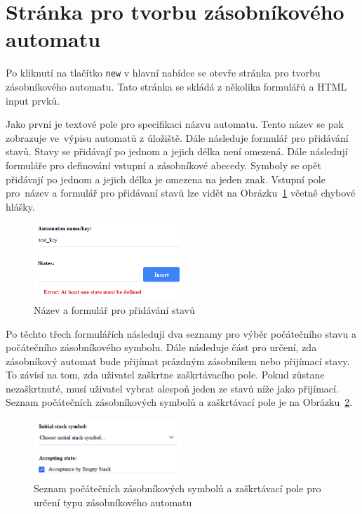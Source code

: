\section{Stránka pro tvorbu zásobníkového automatu}\label{sec:PDABuilder}

Po kliknutí na tlačítko \texttt{new} v hlavní nabídce se otevře stránka pro tvorbu zásobníkového automatu. Tato stránka se skládá z několika formulářů a HTML input prvků. 

Jako první je textové pole pro specifikaci názvu automatu. Tento název se pak zobrazuje ve~výpisu automatů z úložiště. Dále následuje formulář pro přidávání stavů. Stavy se přidávají po jednom a jejich délka není omezená. Dále následují formuláře pro definování vstupní a zásobníkové abecedy. Symboly se opět přidávají po jednom a jejich délka je omezena na jeden znak. Vstupní pole pro~název a formulář pro přidávaní stavů lze vidět na Obrázku~\ref{fig:BuilderPart1} včetně chybové hlášky.

\begin{figure}[h]
    \centering
    \includegraphics[width=0.5\textwidth]{Figures/PrntScrn_UI_BuilderPart1.png}
    \caption{Název a formulář pro přidávání stavů}\label{fig:BuilderPart1}
\end{figure}

Po těchto třech formulářích následují dva seznamy pro výběr počátečního stavu a počátečního zásobníkového symbolu. Dále následuje část pro určení, zda zásobníkový automat bude přijímat prázdným zásobníkem nebo přijímací stavy. To závisí na tom, zda uživatel zaškrtne zaškrtávacího pole. Pokud zůstane nezaškrtnuté, musí uživatel vybrat alespoň jeden ze stavů níže jako přijímací. Seznam počátečních zásobníkových symbolů a zaškrtávací pole je na Obrázku~\ref{fig:BuilderPart2}.

\begin{figure}[h]
    \centering
    \includegraphics[width=0.5\textwidth]{Figures/PrntScrn_UI_BuilderPart2.png}
    \caption{Seznam počátečních zásobníkových symbolů a zaškrtávací pole pro určení typu zásobníkového automatu}\label{fig:BuilderPart2}
\end{figure}

